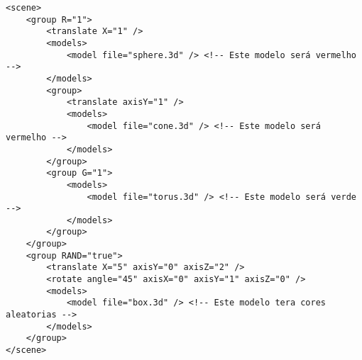 \begin{verbatim}
<scene>
    <group R="1">
        <translate X="1" />
        <models>
            <model file="sphere.3d" /> <!-- Este modelo será vermelho -->
        </models>
        <group>
            <translate axisY="1" />
            <models>
                <model file="cone.3d" /> <!-- Este modelo será vermelho -->
            </models>
        </group>
        <group G="1">
            <models>
                <model file="torus.3d" /> <!-- Este modelo será verde -->
            </models>
        </group>
    </group>
    <group RAND="true">
        <translate X="5" axisY="0" axisZ="2" />
        <rotate angle="45" axisX="0" axisY="1" axisZ="0" />
        <models>
            <model file="box.3d" /> <!-- Este modelo tera cores aleatorias -->
        </models>
    </group>
</scene>
\end{verbatim}
